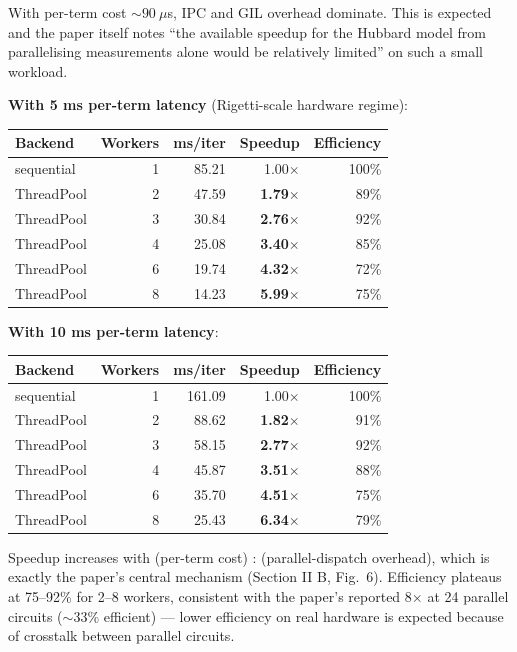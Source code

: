 \documentclass[11pt]{article}
\begin{document}
With per-term cost $\sim 90~\mu$s, IPC and GIL overhead dominate. This is expected and the paper itself notes ``the available speedup for the Hubbard model from parallelising measurements alone would be relatively limited'' on such a small workload.

\textbf{With 5 ms per-term latency} (Rigetti-scale hardware regime):

\begin{tabular}{@{}lrrrr@{}}
\toprule
Backend & Workers & ms/iter & Speedup & Efficiency \\
\midrule
sequential & 1 & 85.21 & 1.00$\times$ & 100\% \\
ThreadPool & 2 & 47.59 & \textbf{1.79$\times$} & 89\% \\
ThreadPool & 3 & 30.84 & \textbf{2.76$\times$} & 92\% \\
ThreadPool & 4 & 25.08 & \textbf{3.40$\times$} & 85\% \\
ThreadPool & 6 & 19.74 & \textbf{4.32$\times$} & 72\% \\
ThreadPool & 8 & 14.23 & \textbf{5.99$\times$} & 75\% \\
\bottomrule
\end{tabular}

\textbf{With 10 ms per-term latency}:

\begin{tabular}{@{}lrrrr@{}}
\toprule
Backend & Workers & ms/iter & Speedup & Efficiency \\
\midrule
sequential & 1 & 161.09 & 1.00$\times$ & 100\% \\
ThreadPool & 2 & 88.62 & \textbf{1.82$\times$} & 91\% \\
ThreadPool & 3 & 58.15 & \textbf{2.77$\times$} & 92\% \\
ThreadPool & 4 & 45.87 & \textbf{3.51$\times$} & 88\% \\
ThreadPool & 6 & 35.70 & \textbf{4.51$\times$} & 75\% \\
ThreadPool & 8 & 25.43 & \textbf{6.34$\times$} & 79\% \\
\bottomrule
\end{tabular}

Speedup increases with (per-term cost) : (parallel-dispatch overhead), which is exactly the paper's central mechanism (Section II B, Fig.~6). Efficiency plateaus at 75--92\% for 2--8 workers, consistent with the paper's reported 8$\times$ at 24 parallel circuits ($\sim$33\% efficient) --- lower efficiency on real hardware is expected because of crosstalk between parallel circuits.
\end{document}
